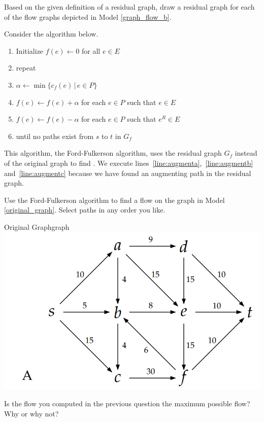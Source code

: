 \documentclass{tufte-handout}
\begin{document}
\begin{questions}
\item Based on the given definition of a residual graph, draw a residual graph for each of the flow graphs depicted in Model \ref{graph_flow_b}.

\newpage

\item Consider the algorithm below. 

\begin{enumerate}
    \item Initialize $f(e) \leftarrow 0$ for all $e \in E$
    \item repeat
    \item \hspace{1cm} $\alpha \leftarrow \min\{ c_{f}(e) \,|\, e \in P\}$ \label{line:augmenta}
    \item \hspace{1cm} $f(e) \leftarrow f(e) + \alpha$ for each $e \in P$ such that $e \in E$  \label{line:augmentb}
    \item \hspace{1cm} $f(e) \leftarrow f(e) - \alpha$ for each $e \in P$ such that $e^{R} \in E$  \label{line:augmentc}
    \item until no paths exist from $s$ to $t$ in $G_f$
\end{enumerate}

This algorithm, the Ford-Fulkerson algorithm, uses the  residual graph $G_f$ instead of the original graph to find . We execute lines~\ref{line:augmenta},~\ref{line:augmentb}
and~\ref{line:augmentc} because we have found an augmenting path
in the residual graph.

Use the Ford-Fulkerson algorithm to find a flow on the graph in Model \ref{original_graph}. Select paths in any order you like. 

\begin{model}{Original Graph}{graph}
\includegraphics[scale=.68]{Flow_POGIL_4.PNG}
\label{original_graph}
\end{model}

\item Is the flow you computed in the previous question the maximum possible flow? Why or why not?

\end{questions}
\end{document}
